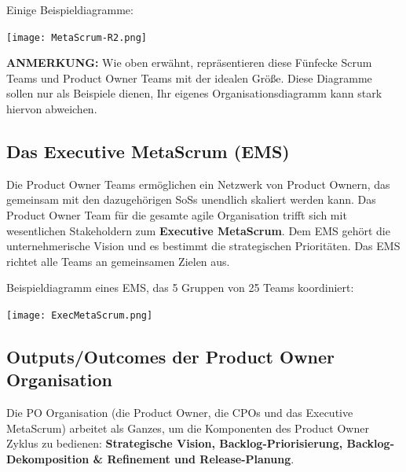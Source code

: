 \documentclass[12pt,a4paper,parskip=full]{scrartcl}
\begin{document}
Einige Beispieldiagramme:

\texttt{[image: MetaScrum-R2.png]}

\textbf{ANMERKUNG:} Wie oben erwähnt, repräsentieren diese Fünfecke Scrum Teams
und Product Owner Teams mit der idealen Größe. Diese Diagramme sollen nur als
Beispiele dienen, Ihr eigenes Organisationsdiagramm kann stark hiervon abweichen.


\subsection{Das Executive MetaScrum (EMS)}
Die Product Owner Teams ermöglichen ein Netzwerk von Product Ownern, das
gemeinsam mit den dazugehörigen SoSs unendlich skaliert werden kann. Das
Product Owner Team für die gesamte agile Organisation trifft sich mit
wesentlichen Stakeholdern zum \textbf{Executive MetaScrum}. Dem EMS gehört
die unternehmerische Vision und es bestimmt die strategischen Prioritäten.
Das EMS richtet alle Teams an gemeinsamen Zielen aus.

Beispieldiagramm eines EMS, das 5 Gruppen von 25 Teams koordiniert:

\texttt{[image: ExecMetaScrum.png]}

\subsection{Outputs/Outcomes der Product Owner Organisation}
Die PO Organisation (die Product Owner, die CPOs und das Executive MetaScrum)
arbeitet als Ganzes, um die Komponenten des Product Owner Zyklus zu bedienen:
\textbf{Strategische Vision, Backlog-Priorisierung, Backlog-Dekomposition \& Refinement und Release-Planung}.
\end{document}
